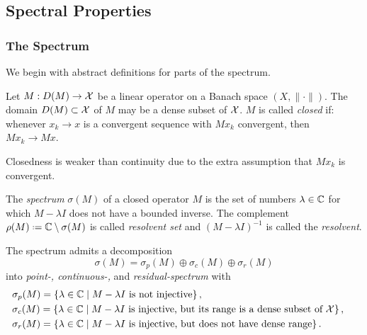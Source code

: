 \subsection{Spectral Properties}

\subsubsection{The Spectrum}

We begin with abstract definitions for parts of the spectrum. 

\begin{definition}
    Let $M : D(M) \to \mathcal{X}$ be a linear operator on a Banach space 
    $(X, \| \cdot \|)$. The domain $D(M) \subset \mathcal{X}$ of $M$ 
    may be a dense subset of $\mathcal{X}$. $M$ is called \emph{closed} if: whenever 
    $x_k \to x$ is a convergent sequence with $M x_k$ convergent, then $M x_k \to M x$. 
\end{definition}

Closedness is weaker than continuity due to the extra assumption that $M x_k$ is 
convergent. 

\begin{definition}
    The \emph{spectrum} $\sigma (M)$ of a closed operator $M$ is the set of numbers 
    $\lambda \in \mathbb{C}$ for which $M - \lambda I$ does not have a bounded inverse. The 
    complement $\rho (M) \defeq \bbC \setminus \sigma (M)$ is called \emph{resolvent set} 
    and $( M - \lambda I )^{-1}$ is called the \emph{resolvent}. 
\end{definition}

\begin{proposition}
    The spectrum admits a decomposition 
    \begin{equation}
        \sigma (M) = \sigma_p (M) \oplus \sigma_c (M) \oplus \sigma_r (M)
    \end{equation}
    into \emph{point-, continuous-,} and \emph{residual-spectrum} with
    \begin{align}
        &\sigma_p (M) = \left\{ \lambda \in \mathbb{C} \mid 
            M - \lambda I \text{ is not injective} \right\}, &\phantom{.} \\
        &\sigma_c (M) = \left\{ \lambda \in \mathbb{C} \mid 
            M - \lambda I \text{ is injective, but its range is a dense subset of } 
            \mathcal{X} \right\}, \\
        &\sigma_r (M) = \left\{ \lambda \in \mathbb{C} \mid 
            M - \lambda I \text{ is injective, but does not have dense range} \right\}. 
    \end{align}
\end{proposition}

